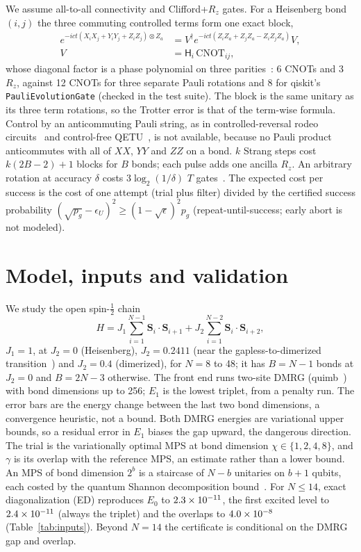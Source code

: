 \documentclass[aps,pra,twocolumn,superscriptaddress,nofootinbib]{revtex4-2}
\begin{document}
We assume all-to-all connectivity and Clifford+$R_z$ gates. For a Heisenberg bond $(i,j)$ the three commuting
controlled terms form one exact block,
\begin{align}
e^{-ict(X_iX_j+Y_iY_j+Z_iZ_j)\otimes Z_a}
&=V^\dagger e^{-ict(Z_iZ_a+Z_jZ_a-Z_iZ_jZ_a)}V,\nonumber\\
V&=\mathsf H_i\,\mathrm{CNOT}_{ij},
\label{eq:bond}
\end{align}
whose diagonal factor is a phase polynomial on three parities~\cite{Amy2014}: 6 CNOTs and 3 $R_z$, against 12
CNOTs for three separate Pauli rotations and 8 for qiskit's \texttt{PauliEvolutionGate} (checked in the test
suite). The block is the same unitary as its three term rotations, so the Trotter error is that of the term-wise
formula. Control by an anticommuting Pauli string, as in controlled-reversal rodeo
circuits~\cite{BeeLindgren2025} and control-free QETU~\cite{Dong2022}, is not available, because no Pauli product
anticommutes with all of $XX$, $YY$ and $ZZ$ on a bond. $k$ Strang steps cost $k(2B-2)+1$ blocks for $B$ bonds;
each pulse adds one ancilla $R_z$. An arbitrary rotation at accuracy $\delta$ costs $3\log_2(1/\delta)$ $T$
gates~\cite{Ross2016}. The expected cost per success is the cost of one attempt (trial plus filter) divided by the
certified success probability $(\sqrt{p_g}-\epsilon_U)^2\ge(1-\sqrt\epsilon)^2p_g$ (repeat-until-success; early
abort is not modeled).

\section{Model, inputs and validation}
\label{sec:application}

We study the open spin-$\frac12$ chain
\begin{equation}
H=J_1\sum_{i=1}^{N-1}\mathbf S_i\cdot\mathbf S_{i+1}+J_2\sum_{i=1}^{N-2}\mathbf S_i\cdot\mathbf S_{i+2},
\end{equation}
$J_1=1$, at $J_2=0$ (Heisenberg), $J_2=0.2411$ (near the gapless-to-dimerized
transition~\cite{Okamoto1992,Eggert1996}) and $J_2=0.4$ (dimerized), for $N=8$ to 48; it has $B=N-1$ bonds at
$J_2=0$ and $B=2N-3$ otherwise. The front end runs two-site DMRG (quimb~\cite{Gray2018}) with bond dimensions up
to 256; $E_1$ is the lowest triplet, from a penalty run. The error bars are the energy change between the last two
bond dimensions, a convergence heuristic, not a bound. Both DMRG energies are variational upper bounds, so a
residual error in $E_1$ biases the gap upward, the dangerous direction. The trial is the variationally optimal MPS
at bond dimension $\chi\in\{1,2,4,8\}$, and $\gamma$ is its overlap with the reference MPS, an estimate rather than
a lower bound. An MPS of bond dimension $2^b$ is a staircase of $N-b$ unitaries on $b+1$ qubits, each costed by the
quantum Shannon decomposition bound~\cite{Shende2006}. For $N\le14$, exact diagonalization (ED) reproduces $E_0$ to
$2.3\times10^{-11}$, the first excited level to $2.4\times10^{-11}$ (always the triplet) and the overlaps to
$4.0\times10^{-8}$ (Table~\ref{tab:inputs}). Beyond $N=14$ the certificate is conditional on the DMRG gap and overlap.
\end{document}
